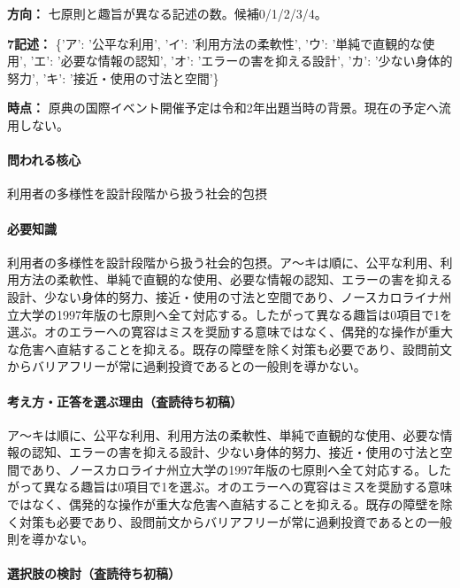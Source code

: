 \noindent\textbf{方向：} 七原則と趣旨が異なる記述の数。候補0/1/2/3/4。\par

\noindent\textbf{7記述：} \{'ア': '公平な利用', 'イ': '利用方法の柔軟性', 'ウ': '単純で直観的な使用', 'エ': '必要な情報の認知', 'オ': 'エラーの害を抑える設計', 'カ': '少ない身体的努力', 'キ': '接近・使用の寸法と空間'\}\par

\noindent\textbf{時点：} 原典の国際イベント開催予定は令和2年出題当時の背景。現在の予定へ流用しない。\par

\paragraph{問われる核心} 利用者の多様性を設計段階から扱う社会的包摂

\paragraph{必要知識} 利用者の多様性を設計段階から扱う社会的包摂。ア〜キは順に、公平な利用、利用方法の柔軟性、単純で直観的な使用、必要な情報の認知、エラーの害を抑える設計、少ない身体的努力、接近・使用の寸法と空間であり、ノースカロライナ州立大学の1997年版の七原則へ全て対応する。したがって異なる趣旨は0項目で1を選ぶ。オのエラーへの寛容はミスを奨励する意味ではなく、偶発的な操作が重大な危害へ直結することを抑える。既存の障壁を除く対策も必要であり、設問前文からバリアフリーが常に過剰投資であるとの一般則を導かない。

\paragraph{考え方・正答を選ぶ理由（査読待ち初稿）} ア〜キは順に、公平な利用、利用方法の柔軟性、単純で直観的な使用、必要な情報の認知、エラーの害を抑える設計、少ない身体的努力、接近・使用の寸法と空間であり、ノースカロライナ州立大学の1997年版の七原則へ全て対応する。したがって異なる趣旨は0項目で1を選ぶ。オのエラーへの寛容はミスを奨励する意味ではなく、偶発的な操作が重大な危害へ直結することを抑える。既存の障壁を除く対策も必要であり、設問前文からバリアフリーが常に過剰投資であるとの一般則を導かない。

\paragraph{選択肢の検討（査読待ち初稿）}\mbox{}\par

